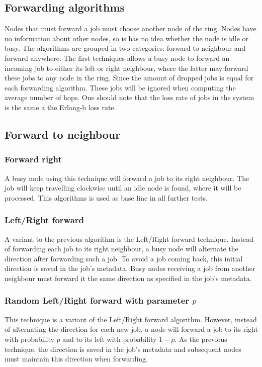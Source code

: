 \documentclass[10pt,a4paper]{article}
\begin{document}
\subsection{Forwarding algorithms}
Nodes that must forward a job must choose another node of the ring. Nodes have no information about other nodes, so is has no idea whether the node is idle or busy. The algorithms are grouped in two categories: forward to neighbour and forward anywhere.
The first techniques allows a busy node to forward an incoming job to either its left or right neighbour, where the latter may forward these jobs to any node in the ring. 
Since the amount of dropped jobs is equal for each forwarding algorithm. These jobs will be ignored when computing the average number of hops. One should note that the loss rate of jobs in the system is the same a the Erlang-b loss rate.


\subsection{Forward to neighbour}
\subsubsection{Forward right}
A busy node using this technique will forward a job to its right neighbour. The job will keep travelling clockwise until an idle node is found, where it will be processed. This algorithms is used as base line in all further tests.

\subsubsection{Left/Right forward}
A variant to the previous algorithm is the Left/Right forward technique. Instead of forwarding each job to its right neighbour, a busy node will alternate the direction after forwarding such a job. To avoid a job coming back, this initial direction is saved in the job's metadata. Busy nodes receiving a job from another neighbour must forward it the same direction as specified in the job's metadata.

\subsubsection{Random Left/Right forward with parameter $p$}
This technique is a variant of the Left/Right forward algorithm. However, instead of alternating the direction for each new job, a node will forward a job to its right with probability $p$ and to its left with probability $1-p$. As the previous technique, the direction is saved in the job's metadata and subsequent nodes must maintain this direction when forwarding.
\end{document}
